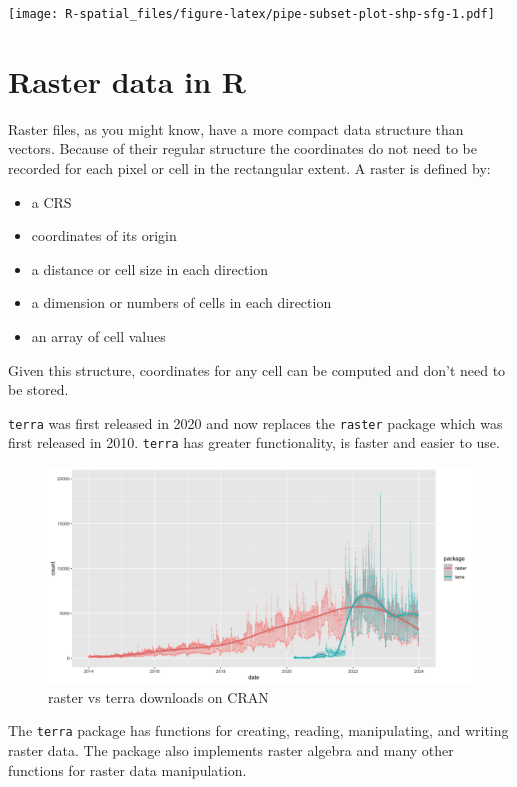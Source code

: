 \documentclass[
]{book}
\providecommand{\tightlist}{%
  \setlength{\itemsep}{0pt}\setlength{\parskip}{0pt}}
\begin{document}
\texttt{[image: R-spatial\_files/figure-latex/pipe-subset-plot-shp-sfg-1.pdf]}

\hypertarget{raster-data-in-r}{%
\section{Raster data in R}\label{raster-data-in-r}}

Raster files, as you might know, have a more compact data structure than vectors. Because of their regular structure the coordinates do not need to be recorded for each pixel or cell in the rectangular extent. A raster is defined by:

\begin{itemize}
\tightlist
\item
  a CRS
\item
  coordinates of its origin
\item
  a distance or cell size in each direction
\item
  a dimension or numbers of cells in each direction
\item
  an array of cell values
\end{itemize}

Given this structure, coordinates for any cell can be computed and don't need to be stored.

\texttt{terra} was first released in 2020 and now replaces the \texttt{raster} package which was first released in 2010. \texttt{terra} has greater functionality, is faster and easier to use.

\begin{figure}
\includegraphics[width=1\linewidth]{img/raster_terraDownloads} \caption{raster vs terra downloads on CRAN}\label{fig:raster-terraDownloads}
\end{figure}

The \texttt{terra} package has functions for creating, reading, manipulating, and writing raster data. The package also implements raster algebra and many other functions for raster data manipulation.
\end{document}
